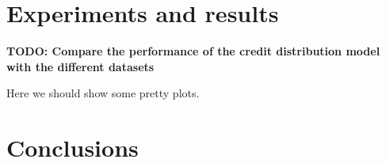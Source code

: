 \documentclass{acm_proc_article-sp}
\begin{document}
\section{Experiments and results}
\textbf{TODO: Compare the performance of the credit distribution model with the different datasets}

Here we should show some pretty plots.

\section{Conclusions}


%

%

\balancecolumns
\end{document}
